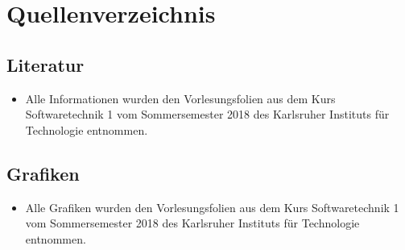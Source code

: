 \section{Quellenverzeichnis}
	
	\subsection{Literatur}
		
		\begin{itemize}
			\item Alle Informationen wurden den Vorlesungsfolien aus dem Kurs Softwaretechnik 1 vom Sommersemester 2018 des Karlsruher Instituts für Technologie entnommen.
		\end{itemize}
			
	\subsection{Grafiken}
				
		\begin{itemize}
			\item Alle Grafiken wurden den Vorlesungsfolien aus dem Kurs Softwaretechnik 1 vom Sommersemester 2018 des Karlsruher Instituts für Technologie entnommen.
		\end{itemize}